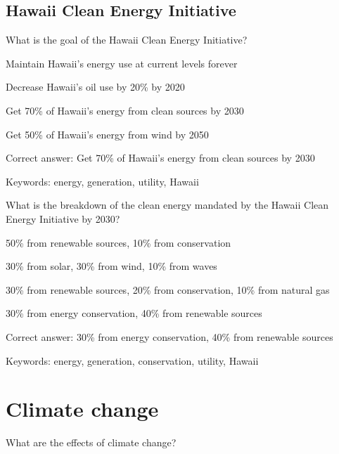 \subsection{Hawaii Clean Energy Initiative}

\begin{question}
	\item What is the goal of the Hawaii Clean Energy Initiative?
\end{question}

\begin{answer}
	\item Maintain Hawaii's energy use at current levels forever
	\item Decrease Hawaii's oil use by 20\% by 2020
	\item Get 70\% of Hawaii's energy from clean sources by 2030
	\item Get 50\% of Hawaii's energy from wind by 2050
\end{answer}

Correct answer: Get 70\% of Hawaii's energy from clean sources by 2030

Keywords: energy, generation, utility, Hawaii

\begin{question}
	\item What is the breakdown of the clean energy mandated by the Hawaii Clean Energy Initiative by 2030?
\end{question}

\begin{answer}
	\item 50\% from renewable sources, 10\% from conservation
	\item 30\% from solar, 30\% from wind, 10\% from waves
	\item 30\% from renewable sources, 20\% from conservation, 10\% from natural gas
	\item 30\% from energy conservation, 40\% from renewable sources
\end{answer}

Correct answer: 30\% from energy conservation, 40\% from renewable sources

Keywords: energy, generation, conservation, utility, Hawaii

\section{Climate change}

\begin{question}
	\item What are the effects of climate change?
\end{question}


